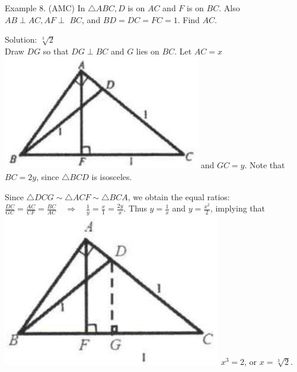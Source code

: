 \documentclass[10pt]{article}
\begin{document}
Example 8. (AMC) In \(\triangle A B C, D\) is on \(A C\) and \(F\) is on \(B C\). Also \(A B \perp A C, A F \perp\) \(B C\), and \(B D=D C=F C=1\). Find \(A C\).

Solution: \(\sqrt[3]{2}\)\\
Draw \(D G\) so that \(D G \perp B C\) and \(G\) lies on \(B C\). Let \(A C=x\)\\
\includegraphics[max width=\textwidth]{2025_04_17_97bc1f7e44d93c271a88g-079(3)} and \(G C=y\). Note that \(B C=2 y\), since \(\triangle B C D\) is isosceles.


Since \(\triangle D C G \sim \triangle A C F \sim \triangle B C A\), we obtain the equal ratios: \(\frac{D C}{G C}=\frac{A C}{C F}=\frac{B C}{A C} \quad \Rightarrow \quad \frac{1}{y}=\frac{x}{1}=\frac{2 y}{x}\). Thus \(y=\frac{1}{x}\) and \(y=\frac{x^{2}}{2}\), implying that\\
\includegraphics[max width=\textwidth]{2025_04_17_97bc1f7e44d93c271a88g-080(2)} \(x^{3}=2\), or \(x=\sqrt[3]{2}\).
\end{document}
